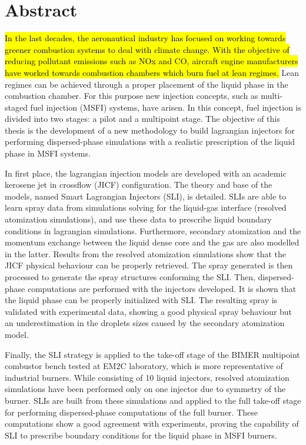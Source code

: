 \chapter*{Abstract}
    
\hl{In the last decades, the aeronautical industry has focused on working towards greener combustion systems to deal with climate change. With the objective of reducing pollutant emissions such as NOx and CO, aircraft engine manufacturers have worked towards combustion chambers which burn fuel at lean regimes.} Lean regimes can be achieved through a proper placement of the liquid phase in the combustion chamber. For this purpose new injection concepts, such as multi-staged fuel injection (MSFI) systems, have arisen. In this concept, fuel injection is divided into two stages: a pilot and a multipoint stage. The objective of this thesis is the development of a new methodology to build lagrangian injectors for performing dispersed-phase simulations with a realistic prescription of the liquid phase in MSFI systems.

In first place, the lagrangian injection models are developed with an academic kerosene jet in crossflow (JICF) configuration. The theory and base of the models, named Smart Lagrangian Injectors (SLI), is detailed. SLIs are able to learn spray data from simulations solving for the liquid-gas interface (resolved atomization simulations), and use these data to prescribe liquid boundary conditions in lagrangian simulations. Furthermore, secondary atomization and the momentum exchange between the liquid dense core and the gas are also modelled in the latter.  Results from the resolved atomization simulations show that the JICF physical behaviour can be properly retrieved. The spray generated is then processed to generate the spray structures conforming the SLI. Then, dispersed-phase computations are performed with the injectors developed. It is shown that the liquid phase can be properly initialized with SLI. The resulting spray is validated with experimental data, showing a good physical spray behaviour but an underestimation in the droplets sizes caused by the secondary atomization model. %

Finally, the SLI strategy is applied to the take-off stage of the BIMER multipoint combustor bench tested at EM2C laboratory, which is more representative of industrial burners. While consisting of 10 liquid injectors, resolved atomization simulations have been performed only on one injector due to symmetry of the burner. SLIs are built from these simulations and applied to the full take-off stage for performing dispersed-phase computations of the full burner. These computations show a good agreement with experiments, proving the capability of SLI to prescribe boundary conditions for the liquid phase in MSFI burners.

